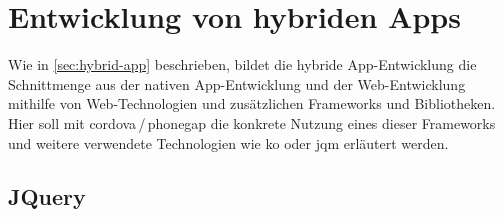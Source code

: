\begin{comment}


\section{Plattformunabhängige App-Entwicklung}


\subsection[Lösungen]{Lösungen für die plattformunabhängige App-Entwicklung}



\end{comment}

\section{Entwicklung von hybriden Apps}\label{sec:hybrid-dev}

Wie in \ref{sec:hybrid-app} beschrieben, bildet die hybride App-Entwicklung die Schnittmenge aus der nativen App-Entwicklung und der Web-Entwicklung mithilfe von Web-Technologien und zusätzlichen Frameworks und Bibliotheken. 
Hier soll mit \gls{cordova}\,/\,\gls{phonegap} die konkrete Nutzung eines dieser Frameworks und weitere verwendete Technologien wie \gls{ko} oder \gls{jqm} erläutert werden.

\subsection{JQuery}

